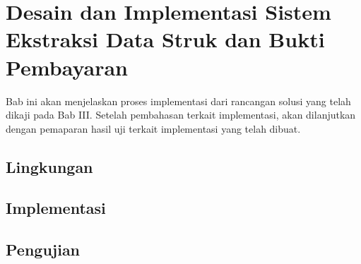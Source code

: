 \chapter{Desain dan Implementasi Sistem Ekstraksi Data Struk dan Bukti Pembayaran}
Bab ini akan menjelaskan proses implementasi dari rancangan solusi yang telah dikaji pada Bab III. Setelah pembahasan terkait implementasi, akan dilanjutkan dengan pemaparan hasil uji terkait implementasi yang telah dibuat.

\section{Lingkungan}
\blindtext

\section{Implementasi}
\blindtext

\section{Pengujian}
\blindtext

